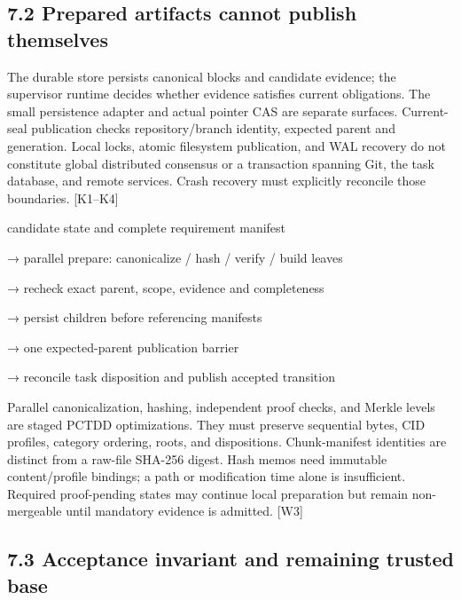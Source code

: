 \subsection*{7.2 Prepared artifacts cannot publish themselves}

The durable store persists canonical blocks and candidate evidence; the supervisor runtime decides
whether evidence satisfies current obligations. The small persistence adapter and actual pointer CAS
are separate surfaces. Current-seal publication checks repository/branch identity, expected parent and
generation. Local locks, atomic filesystem publication, and WAL recovery do not constitute global
distributed consensus or a transaction spanning Git, the task database, and remote services. Crash
recovery must explicitly reconcile those boundaries. [K1–K4]




\noindent candidate state and complete requirement manifest\par
\noindent → parallel prepare: canonicalize / hash / verify / build leaves\par
\noindent → recheck exact parent, scope, evidence and completeness\par
\noindent → persist children before referencing manifests\par
\noindent → one expected-parent publication barrier\par
\noindent → reconcile task disposition and publish accepted transition\par

Parallel canonicalization, hashing, independent proof checks, and Merkle levels are staged PCTDD
optimizations. They must preserve sequential bytes, CID profiles, category ordering, roots, and
dispositions. Chunk-manifest identities are distinct from a raw-file SHA-256 digest. Hash memos
need immutable content/profile bindings; a path or modification time alone is insufficient. Required
proof-pending states may continue local preparation but remain non-mergeable until mandatory
evidence is admitted. [W3]

\subsection*{7.3 Acceptance invariant and remaining trusted base}

